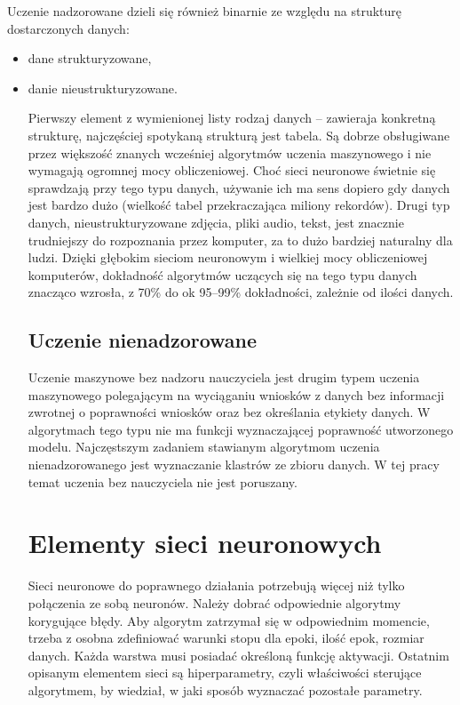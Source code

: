 \documentclass[12pt,a4paper,twoside,titlepage,openright]{book}
\begin{document}
Uczenie nadzorowane dzieli się również binarnie ze względu na strukturę dostarczonych danych:
\begin{itemize}
\item dane strukturyzowane,
\item danie nieustrukturyzowane.

Pierwszy element z wymienionej listy rodzaj danych -- zawieraja konkretną strukturę, najczęściej spotykaną strukturą jest tabela. Są dobrze obsługiwane przez większość znanych wcześniej algorytmów uczenia maszynowego i nie wymagają ogromnej mocy obliczeniowej. Choć sieci neuronowe świetnie się sprawdzają przy tego typu danych, używanie ich ma sens dopiero gdy danych jest bardzo dużo (wielkość tabel przekraczająca miliony rekordów). Drugi typ danych, nieustrukturyzowane zdjęcia, pliki audio, tekst, jest znacznie trudniejszy do rozpoznania przez komputer, za to dużo bardziej naturalny dla ludzi. Dzięki głębokim sieciom neuronowym i wielkiej mocy obliczeniowej komputerów, dokładność algorytmów uczących się na tego typu danych znacząco wzrosła, z 70\% do ok 95--99\% dokładności, zależnie od ilości danych.

\subsection*{Uczenie nienadzorowane}
Uczenie maszynowe bez nadzoru nauczyciela jest drugim typem uczenia maszynowego polegającym na wyciąganiu wniosków z danych bez informacji zwrotnej o poprawności wniosków oraz bez określania etykiety danych. W algorytmach tego typu nie ma funkcji wyznaczającej poprawność utworzonego modelu. Najczęstszym zadaniem stawianym algorytmom uczenia nienadzorowanego jest wyznaczanie klastrów ze zbioru danych. W tej pracy temat uczenia bez nauczyciela nie jest poruszany.

\section{Elementy sieci neuronowych} 
Sieci neuronowe do poprawnego działania potrzebują więcej niż tylko połączenia ze sobą neuronów. Należy dobrać odpowiednie algorytmy korygujące błędy. Aby algorytm zatrzymał się w odpowiednim momencie, trzeba z osobna zdefiniować warunki stopu dla epoki, ilość epok, rozmiar danych. Każda warstwa musi posiadać określoną funkcję aktywacji. Ostatnim opisanym elementem sieci są hiperparametry, czyli właściwości sterujące algorytmem, by wiedział, w jaki sposób wyznaczać pozostałe parametry.


\end{itemize}
\end{document}
